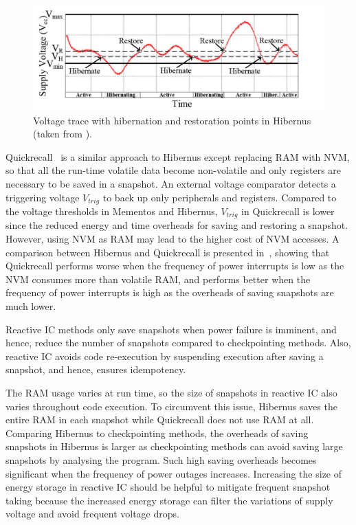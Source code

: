 \begin{figure}
    \centering
    \includegraphics[width=\columnwidth]{ch2_review/figures/hibernus}
    \caption{Voltage trace with hibernation and restoration points in Hibernus (taken from \cite{balsamo2015hibernus}).}
    \label{Figure:hibernus}
\end{figure}

Quickrecall~\cite{jayakumar2014quickrecall} is a similar approach to Hibernus except replacing RAM with NVM, so that all the run-time volatile data become non-volatile and only registers are necessary to be saved in a snapshot. An external voltage comparator detects a triggering voltage $V_{trig}$ to back up only peripherals and registers. Compared to the voltage thresholds in Mementos and Hibernus, $V_{trig}$ in Quickrecall is lower since the reduced energy and time overheads for saving and restoring a snapshot. However, using NVM as RAM may lead to the higher cost of NVM accesses. A comparison between Hibernus and Quickrecall is presented in~\cite{rodriguez2015approaches}, showing that Quickrecall performs worse when the frequency of power interrupts is low as the NVM consumes more than volatile RAM, and performs better when the frequency of power interrupts is high as the overheads of saving snapshots are much lower.

Reactive IC methods only save snapshots when power failure is imminent, and hence, reduce the number of snapshots compared to checkpointing methods. Also, reactive IC avoids code re-execution by suspending execution after saving a snapshot, and hence, ensures idempotency. 

The RAM usage varies at run time, so the size of snapshots in reactive IC also varies throughout code execution. To circumvent this issue, Hibernus saves the entire RAM in each snapshot while Quickrecall does not use RAM at all. Comparing Hibernus to checkpointing methods, the overheads of saving snapshots in Hibernus is larger as checkpointing methods can avoid saving large snapshots by analysing the program. Such high saving overheads becomes significant when the frequency of power outages increases. Increasing the size of energy storage in reactive IC should be helpful to mitigate frequent snapshot taking because the increased energy storage can filter the variations of supply voltage and avoid frequent voltage drops. 

